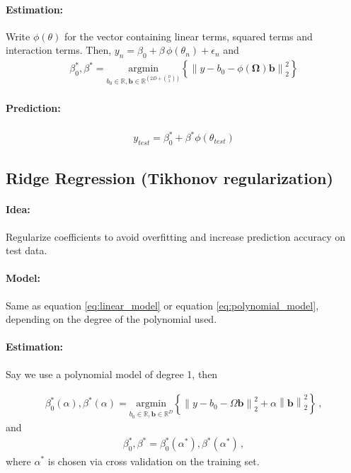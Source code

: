 \documentclass[a4paper, 12pt]{article}
\newcommand{\norm}[1]{\left\lVert#1\right\rVert}
\begin{document}
\paragraph{Estimation:}
Write $\phi(\theta)$ for the vector containing linear terms, squared terms and interaction terms.
Then, $y_n = \beta_0 + \beta \, \phi(\theta_n) + \epsilon_n$ and
\begin{align}
  \beta_0^*, \beta^* = \underset{b_0 \in \mathbb{R}, \bm{b} \in \mathbb{R}^{(2D + {D \choose 2})}}{\text{argmin}} \left\{  \norm{y - b_0 - \phi(\bm{\Omega}) \bm{b}}_2^2 \right \}
\end{align}

\paragraph{Prediction:}
\begin{align}\label{eq:polynomial_prediction}
y_{test} = \beta_0^* + \beta^* \phi(\theta_{test})
\end{align}


\subsection{Ridge Regression (Tikhonov regularization)}

\paragraph{Idea:} Regularize coefficients to avoid overfitting and increase prediction accuracy on test data.

\paragraph{Model:} Same as equation \ref{eq:linear_model} or equation \ref{eq:polynomial_model}, depending on the degree of the polynomial used.

\paragraph{Estimation:} Say we use a polynomial model of degree 1, then

\begin{align}
  \beta_0^{*}(\alpha), \beta^{*}(\alpha) = \underset{b_0 \in \mathbb{R}, \bm{b} \in \mathbb{R}^D}{\text{argmin}} \left\{  \norm{y - b_0 - \Omega \bm{b}}_2^2 + \alpha \norm{\bm{b}}_2^2 \right\} \,,
\end{align}
and
\begin{align}
  \beta_0^*, \beta^* = \beta_0^*(\alpha^*), \beta^*(\alpha^*) \,,
\end{align}
where $\alpha^*$ is chosen via cross validation on the training set.
\end{document}
